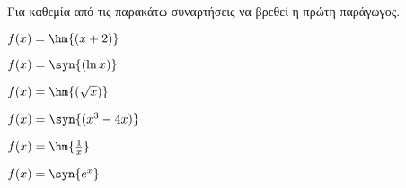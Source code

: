 Για καθεμία από τις παρακάτω συναρτήσεις να βρεθεί η πρώτη παράγωγος.
\begin{multicols}{2}
\begin{alist}
\item $ f(x)=\hm{(x+2)} $
\item $ f(x)=\syn{(\ln{x})} $
\item $ f(x)=\hm{(\sqrt{x})} $
\item $ f(x)=\syn{(x^3-4x)} $
\item $ f(x)=\hm{\frac{1}{x}} $
\item $ f(x)=\syn{e^x} $
\end{alist}
\end{multicols}
